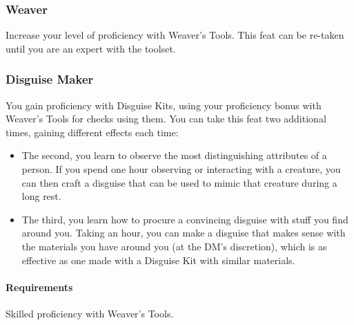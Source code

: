 \subsubsection{Weaver} \label{feat::weaver}
    Increase your level of proficiency with Weaver's Tools.
    This feat can be re-taken until you are an expert with the toolset.
\subsubsection{Disguise Maker} \label{feat::disguisemaker}
    You gain proficiency with Disguise Kits, using your proficiency bonus with Weaver's Tools for checks using them.
    You can take this feat two additional times, gaining different effects each time:
    \begin{itemize}
        \item The second, you learn to observe the most distinguishing attributes of a person.
        If you spend one hour observing or interacting with a creature, you can then craft a disguise that can be used to mimic that creature during a long rest.
        \item The third, you learn how to procure a convincing disguise with stuff you find around you.
        Taking an hour, you can make a disguise that makes sense with the materials you have around you (at the DM's discretion), which is as effective as one made with a Disguise Kit with similar materials.
    \end{itemize}
    \paragraph{Requirements} Skilled proficiency with Weaver's Tools.

